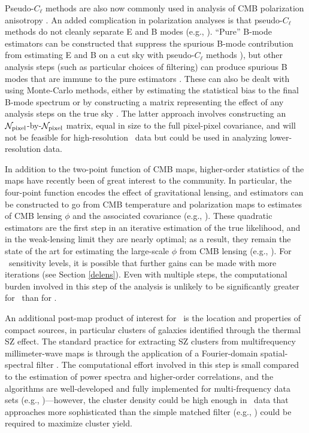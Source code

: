 Pseudo-$C_\ell$ methods are also now commonly used in analysis of CMB polarization anisotropy
\cite{Aghanim:2015xee,Naess:2014wtr,Crites:2014prc}. An added complication in polarization analyses is that 
pseudo-$C_\ell$ methods do not cleanly separate E and B modes (e.g., \cite{Challinor:2005jy}).
``Pure'' B-mode estimators can be constructed that suppress the spurious B-mode contribution
from estimating E and B on a cut sky with pseudo-$C_\ell$ methods \cite{Smith:2005gi}), but 
other analysis steps (such as particular choices of filtering) can produce spurious B modes that
are immune to the pure estimators \cite{Keisler:2015hfa}. These can also be dealt with using Monte-Carlo
methods, either by estimating the statistical bias to the final B-mode spectrum or by constructing
a matrix representing the effect of any analysis steps on the true sky \cite{Ade:2014xna}. The latter
approach involves constructing an ${\cal N}_\mathrm{pixel}$-by-${\cal N}_\mathrm{pixel}$ matrix, equal in size to the 
full pixel-pixel covariance, and will not be feasible for high-resolution \cmbexp\ data but could be 
used in analyzing lower-resolution data.

In addition to the two-point function of CMB maps, higher-order statistics of the maps have recently 
been of great interest to the community. In particular, the four-point function encodes the effect of 
gravitational lensing, and estimators can be constructed to go from CMB temperature and polarization
maps to estimates of CMB lensing $\phi$ and the associated covariance (e.g., \cite{Hu:2001kj,Okamoto:2003zw}).
These quadratic estimators are the first step in an iterative estimation of the true likelihood, and in
the weak-lensing limit they are nearly optimal; as a result, they remain the state of the art for estimating
the large-scale $\phi$ from CMB lensing (e.g., \cite{Ade:2013zuv}). For \cmbexp\ sensitivity levels, 
it is possible that further gains can be made with more iterations (see Section \ref{delens}).
Even with multiple steps, the computational burden involved
in this step of the analysis is unlikely to be significantly greater for \cmbexp\ than for \planck.

An additional post-map product of interest for \cmbexp\ is the location and properties of compact
sources, in particular clusters of galaxies identified through the thermal SZ effect. The standard 
practice for extracting SZ clusters from multifrequency millimeter-wave maps is through the application
of a Fourier-domain spatial-spectral filter \cite{Melin:2006qq}.
The computational effort involved in this step is small compared to the estimation of power spectra 
and higher-order correlations, and the algorithms are well-developed and fully implemented for 
multi-frequency data sets (e.g., \cite{Ade:2013skr,Bleem:2014iim})---however, the cluster density
could be high enough in \cmbexp\ data that approaches more sophisticated than the simple matched
filter (e.g., \cite{Pierpaoli:2004bp}) could be required to maximize cluster yield.

